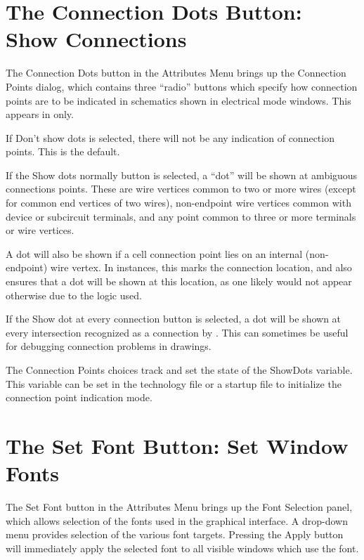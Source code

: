\section{The {\cb Connection Dots} Button: Show Connections}
The {\cb Connection Dots} button in the {\cb Attributes Menu} brings
up the {\cb Connection Points} dialog, which contains three ``radio''
buttons which specify how connection points are to be indicated in
schematics shown in electrical mode windows.  This appears in {\Xic}
only.

If {\cb Don't show dots} is selected, there will not be any indication
of connection points.  This is the default.

If the {\cb Show dots normally} button is selected, a ``dot'' will be
shown at ambiguous connections points.  These are wire vertices common
to two or more wires (except for common end vertices of two wires),
non-endpoint wire vertices common with device or subcircuit terminals,
and any point common to three or more terminals or wire vertices.

A dot will also be shown if a cell connection point lies on an
internal (non-endpoint) wire vertex.  In instances, this marks the
connection location, and also ensures that a dot will be shown at this
location, as one likely would not appear otherwise due to the logic
used.

If the {\cb Show dot at every connection} button is selected, a dot
will be shown at every intersection recognized as a connection by
{\Xic}.  This can sometimes be useful for debugging connection
problems in drawings.

The {\cb Connection Points} choices track and set the state of the
{\et ShowDots} variable.  This variable can be set in the technology
file or a startup file to initialize the connection point indication
mode.


\section{The {\cb Set Font} Button: Set Window Fonts}
The {\cb Set Font} button in the {\cb Attributes Menu} brings up the
{\cb Font Selection} panel, which allows selection of the fonts used
in the graphical interface.  A drop-down menu provides selection of
the various font targets.  Pressing the {\cb Apply} button will
immediately apply the selected font to all visible windows which use
the font.

